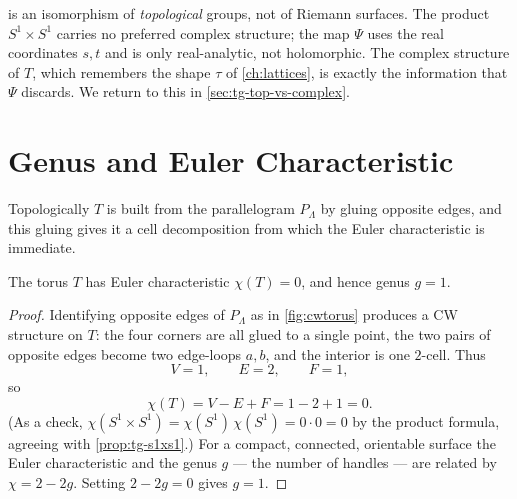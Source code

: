 \begin{warning}
\label{warn:tg-not-biholo}
 is an isomorphism of \emph{topological} groups, not of
Riemann surfaces. The product \(S^1 \times S^1\) carries no preferred complex
structure; the map \(\Psi\) uses the real coordinates \(s, t\) and is only
real-analytic, not holomorphic. The complex structure of \(T\), which remembers
the shape \(\tau\) of \cref{ch:lattices}, is exactly the information that
\(\Psi\) discards. We return to this in \cref{sec:tg-top-vs-complex}.
\end{warning}

\section{Genus and Euler Characteristic}
\label{sec:tg-genus}

Topologically \(T\) is built from the parallelogram \(P_\Lambda\) by gluing
opposite edges, and this gluing gives it a cell decomposition from which the
Euler characteristic is immediate.

\begin{proposition}
\label{prop:tg-euler}
The torus \(T\) has Euler characteristic \(\chi(T) = 0\), and hence genus
\(g = 1\).
\end{proposition}

\begin{proof}
Identifying opposite edges of \(P_\Lambda\) as in \cref{fig:cwtorus} produces a
CW structure on \(T\): the four corners are all glued to a single point, the two
pairs of opposite edges become two edge-loops \(a, b\), and the interior is one
\(2\)-cell. Thus
\[
  V = 1, \qquad E = 2, \qquad F = 1,
\]
so
\[
  \chi(T) = V - E + F = 1 - 2 + 1 = 0 .
\]
(As a check, \(\chi(S^1 \times S^1) = \chi(S^1)\,\chi(S^1) = 0 \cdot 0 = 0\) by
the product formula, agreeing with \cref{prop:tg-s1xs1}.) For a compact,
connected, orientable surface the Euler characteristic and the genus \(g\) --- the
number of handles --- are related by \(\chi = 2 - 2g\). Setting \(2 - 2g = 0\)
gives \(g = 1\).
\end{proof}

